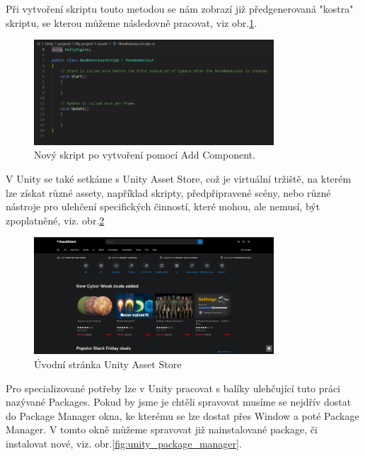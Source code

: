 \documentclass[a4paper,oneside,12pt]{book}
\begin{document}
Při vytvoření skriptu touto metodou se nám zobrazí již předgenerovaná "kostra" skriptu, se kterou můžeme následovně pracovat, viz obr.\ref{fig:unity_skript}.

\begin{figure}[H]
	\centering
	\includegraphics[width=0.8\textwidth]{obrazky/unity_skript_kostra.png}
	\caption{Nový skript po vytvoření pomocí Add Component.}
	\label{fig:unity_skript}
\end{figure}

V Unity se také setkáme s Unity Asset Store, což je virtuální tržiště, na kterém lze získat různé assety, například skripty, předpřipravené scény, nebo různé nástroje pro ulehčení specifických činností, které mohou, ale nemusí, být zpoplatněné, viz. obr.\ref{fig:unity_asset_store}

\begin{figure}[H]
	\centering
	\includegraphics[width=0.8\textwidth]{obrazky/unity_asset_store.jpeg}
	\caption{Úvodní stránka Unity Asset Store}
	\label{fig:unity_asset_store}
\end{figure}

Pro specializované potřeby lze v Unity pracovat s balíky ulehčující tuto práci nazývané Packages. Pokud by jsme je chtěli spravovat musíme se nejdřív dostat do Package Manager okna, ke kterému se lze dostat přes Window a poté Package Manager. V tomto okně můžeme spravovat již nainstalované package, či instalovat nové, viz. obr.\ref{fig:unity_package_manager}.
\end{document}
